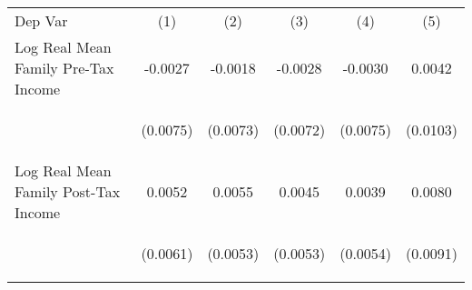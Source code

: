 \begin{center}
\begin{tabular}{lccccc}
\hline \noalign{\smallskip}Dep Var & (1) & (2) & (3) & (4) & (5)\\
\noalign{\smallskip}\hline \noalign{\smallskip}Log Real Mean Family Pre-Tax Income & \begin{scriptsize}-0.0027\end{scriptsize} & \begin{scriptsize}-0.0018\end{scriptsize} & \begin{scriptsize}-0.0028\end{scriptsize} & \begin{scriptsize}-0.0030\end{scriptsize} & \begin{scriptsize}0.0042\end{scriptsize}\\
 & \begin{scriptsize}(0.0075)\end{scriptsize} & \begin{scriptsize}(0.0073)\end{scriptsize} & \begin{scriptsize}(0.0072)\end{scriptsize} & \begin{scriptsize}(0.0075)\end{scriptsize} & \begin{scriptsize}(0.0103)\end{scriptsize}\\
\noalign{\smallskip}Log Real Mean Family Post-Tax Income & \begin{scriptsize}0.0052\end{scriptsize} & \begin{scriptsize}0.0055\end{scriptsize} & \begin{scriptsize}0.0045\end{scriptsize} & \begin{scriptsize}0.0039\end{scriptsize} & \begin{scriptsize}0.0080\end{scriptsize}\\
 & \begin{scriptsize}(0.0061)\end{scriptsize} & \begin{scriptsize}(0.0053)\end{scriptsize} & \begin{scriptsize}(0.0053)\end{scriptsize} & \begin{scriptsize}(0.0054)\end{scriptsize} & \begin{scriptsize}(0.0091)\end{scriptsize}\\

\end{tabular}
\end{center}
